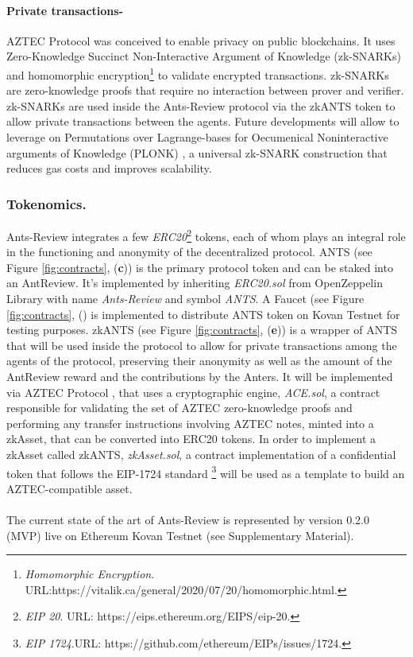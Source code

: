 \documentclass[runningheads]{llncs}
\begin{document}
\paragraph{\textbf{Private transactions}-}AZTEC Protocol was conceived to enable privacy on public blockchains. It uses Zero-Knowledge Succinct Non-Interactive Argument of Knowledge (zk-SNARKs)\cite{zSNARK} and homomorphic encryption\footnote[12]{\emph{Homomorphic Encryption}. \textsc{URL:}\newline https://vitalik.ca/general/2020/07/20/homomorphic.html.} to validate encrypted transactions. zk-SNARKs are zero-knowledge proofs that require no interaction between prover and verifier. zk-SNARKs are used inside the Ants-Review protocol via the zkANTS token to allow private transactions between the agents. Future developments will allow to leverage on Permutations over Lagrange-bases for Oecumenical Noninteractive arguments of Knowledge (PLONK) \cite{PLONK}, 
a universal zk-SNARK construction that reduces gas costs and improves scalability.

\subsubsection{Tokenomics.}
Ants-Review integrates a few \emph{ERC20}\footnote[13]{\emph{EIP 20}. \textsc{URL:} https://eips.ethereum.org/EIPS/eip-20.} tokens, each of whom plays an integral role in the functioning and anonymity of the decentralized protocol.
\newline ANTS (see Figure \ref{fig:contracts}, (\textbf{c})) is the primary protocol token and can be staked into an AntReview. It's implemented by inheriting \emph{ERC20.sol} from OpenZeppelin Library with name \emph{Ants-Review} and symbol \emph{ANTS}.
A Faucet (see Figure \ref{fig:contracts}, () is implemented to distribute ANTS token on Kovan Testnet for testing purposes.
\newline zkANTS (see Figure \ref{fig:contracts}, (\textbf{e})) is a wrapper of ANTS that will be used inside the protocol to allow for private transactions among the agents of the protocol, preserving their anonymity as well as the amount of the AntReview reward and the contributions by the Anters. It will be implemented via AZTEC Protocol \cite{AZTEC}, that uses a cryptographic engine, \emph{ACE.sol}, a contract responsible for validating the set of AZTEC zero-knowledge proofs and performing any transfer instructions involving AZTEC notes, minted into a zkAsset, that can be converted into ERC20 tokens. In order to implement a zkAsset called zkANTS, \emph{zkAsset.sol}, a contract implementation of a confidential token that follows the EIP-1724 standard \footnote[14]{\emph{EIP  1724}.\textsc{URL:} https://github.com/ethereum/EIPs/issues/1724.} will be used as a template to build an AZTEC-compatible asset.
\\
\\
The current state of the art of Ants-Review is represented by version 0.2.0 (MVP) live on Ethereum Kovan Testnet (see Supplementary Material).
\end{document}
